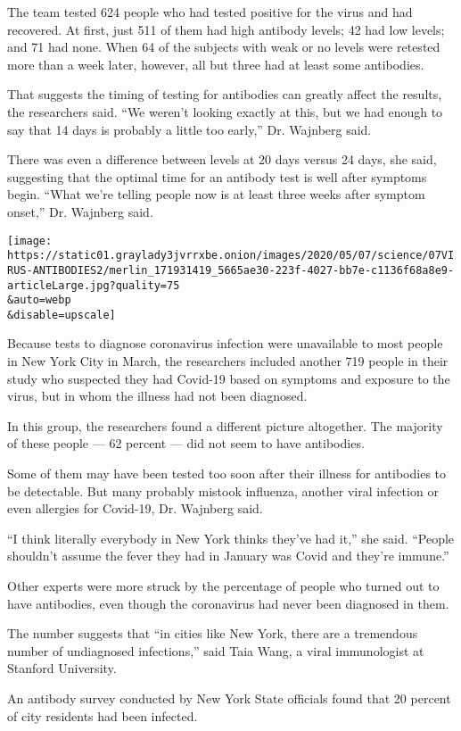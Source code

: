 The team tested 624 people who had tested positive for the virus and had
recovered. At first, just 511 of them had high antibody levels; 42 had
low levels; and 71 had none. When 64 of the subjects with weak or no
levels were retested more than a week later, however, all but three had
at least some antibodies.

That suggests the timing of testing for antibodies can greatly affect
the results, the researchers said. ``We weren't looking exactly at this,
but we had enough to say that 14 days is probably a little too early,''
Dr. Wajnberg said.

There was even a difference between levels at 20 days versus 24 days,
she said, suggesting that the optimal time for an antibody test is well
after symptoms begin. ``What we're telling people now is at least three
weeks after symptom onset,'' Dr. Wajnberg said.

\texttt{[image: https://static01.graylady3jvrrxbe.onion/images/2020/05/07/science/07VIRUS-ANTIBODIES2/merlin\_171931419\_5665ae30-223f-4027-bb7e-c1136f68a8e9-articleLarge.jpg?quality=75\\\&auto=webp\\\&disable=upscale]}

Because tests to diagnose coronavirus infection were unavailable to most
people in New York City in March, the researchers included another 719
people in their study who suspected they had Covid-19 based on symptoms
and exposure to the virus, but in whom the illness had not been
diagnosed.

In this group, the researchers found a different picture altogether. The
majority of these people --- 62 percent --- did not seem to have
antibodies.

Some of them may have been tested too soon after their illness for
antibodies to be detectable. But many probably mistook influenza,
another viral infection or even allergies for Covid-19, Dr. Wajnberg
said.

``I think literally everybody in New York thinks they've had it,'' she
said. ``People shouldn't assume the fever they had in January was Covid
and they're immune.''

Other experts were more struck by the percentage of people who turned
out to have antibodies, even though the coronavirus had never been
diagnosed in them.

The number suggests that ``in cities like New York, there are a
tremendous number of undiagnosed infections,'' said Taia Wang, a viral
immunologist at Stanford University.

An antibody survey conducted by New York State officials found that 20
percent of city residents had been infected.

